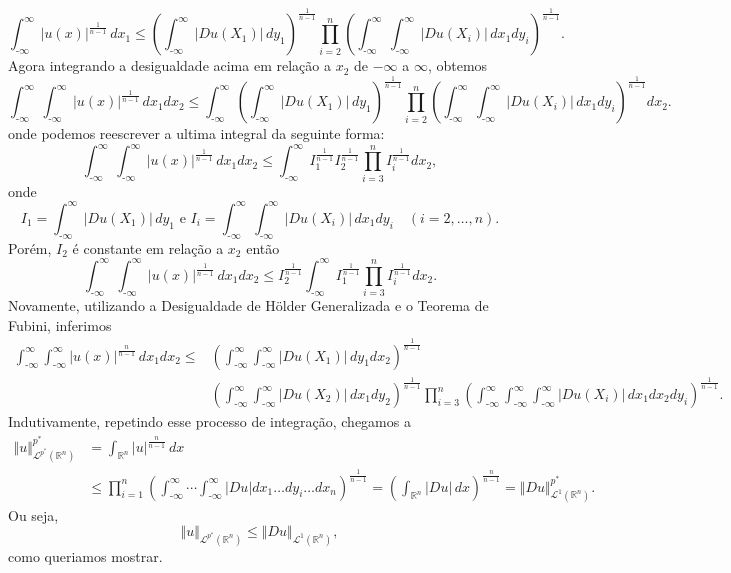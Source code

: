 \documentclass[a4paper, 11pt]{book}
\theoremstyle{definition}
\newcommand{\m}{\text{-}}
\newcommand{\bR}{\mathbb{R}}
\newcommand{\cL}{\mathcal{L}}
\begin{document}
\begin{prf}
    \[
        \int_{\m\infty}^{\infty} |u(x)|^{\frac{1}{n-1}} \,dx_1 \leqslant \left( \int_{\m\infty}^{\infty} |Du(X_1)| \,dy_1 \right)^{\frac{1}{n-1}}\prod_{i=2}^n \left(\int_{\m\infty}^{\infty}   \int_{\m\infty}^{\infty} |Du(X_i)| \, dx_1dy_i\right)^{\frac{1}{n-1}}.
    \]
    Agora integrando a desigualdade acima em relação a $x_2$ de $-\infty$ a $\infty$, obtemos
    \[
        \int_{\m\infty}^{\infty}\int_{\m\infty}^{\infty} |u(x)|^{\frac{1}{n-1}} \,dx_1dx_2 \leqslant \int_{\m\infty}^{\infty}\!\!\left( \int_{\m\infty}^{\infty} |Du(X_1)| \,dy_1 \right)^{\frac{1}{n-1}}\prod_{i=2}^n \left(\int_{\m\infty}^{\infty} \!\int_{\m\infty}^{\infty} |Du(X_i)| \, dx_1dy_i\right)^{\frac{1}{n-1}} dx_2.
    \]
    onde podemos reescrever a ultima integral da seguinte forma:
    \[
        \int_{\m\infty}^{\infty}\int_{\m\infty}^{\infty} |u(x)|^{\frac{1}{n-1}} \,dx_1dx_2 \leqslant \int_{\m\infty}^{\infty} I_1^{\frac{1}{n-1}}I_2^{\frac{1}{n-1}}\prod_{i=3}^n I_i^{\frac{1}{n-1}} dx_2,
    \]
    onde
    \[
        I_1 = \int_{\m\infty}^{\infty} |Du(X_1)| \,dy_1 \text{ e } I_i = \int_{\m\infty}^{\infty} \!\int_{\m\infty}^{\infty} |Du(X_i)| \, dx_1dy_i \quad(i = 2,\dots,n).
    \]
    Porém, $I_2$ é constante em relação a $x_2$ então
    \[
        \int_{\m\infty}^{\infty}\int_{\m\infty}^{\infty} |u(x)|^{\frac{1}{n-1}} \,dx_1dx_2 \leqslant I_2^{\frac{1}{n-1}}\int_{\m\infty}^{\infty} I_1^{\frac{1}{n-1}}\prod_{i=3}^n I_i^{\frac{1}{n-1}} dx_2.
    \]
    Novamente, utilizando a Desigualdade de Hölder Generalizada e o Teorema de Fubini, inferimos
    {\small
    \[
        \begin{aligned}
            \int_{\m\infty}^{\infty}\int_{\m\infty}^{\infty} |u(x)|^{\frac{n}{n-1}} \,dx_1dx_2 \leqslant &\left( \int_{\m\infty}^{\infty} \int_{\m\infty}^{\infty} |Du(X_1)| \,dy_1 dx_2 \right)^{\frac{1}{n-1}}\\ &\left( \int_{\m\infty}^{\infty} \int_{\m\infty}^{\infty} |Du(X_2)| \,dx_1 dy_2 \right)^{\frac{1}{n-1}} \prod_{i=3}^n \left( \int_{\m\infty}^{\infty}\int_{\m\infty}^{\infty}\int_{\m\infty}^{\infty} |Du(X_i)| \,dx_1dx_2dy_i \right)^{\frac{1}{n-1}} \!\!.
        \end{aligned}
    \]\!}
    Indutivamente, repetindo esse processo de integração, chegamos a
    \[
        \begin{aligned}
            \Vert u \Vert_{\cL^{p^*}(\bR^n)}^{p^*} &= \int_{\bR^n} |u|^{\frac{n}{n-1}} \, dx \\
            &\leqslant \prod_{i=1}^n \left( \int_{\m\infty}^{\infty} \cdots \int_{\m\infty}^\infty |Du| dx_1\dots dy_i \dots dx_n \right)^{\frac{1}{n-1}}
            = \left(\int_{\bR^n} |Du|\,dx\right)^{\frac{n}{n-1}} = \Vert Du \Vert_{\cL^1(\bR^n)}^{p^*}.
        \end{aligned}
    \]
    Ou seja,
    \begin{equation} \label{eq:desigualdadegnss}
        \Vert u \Vert_{\cL^{p^*}(\bR^n)} \leqslant\Vert Du \Vert_{\cL^1(\bR^n)},
    \end{equation}
    como queriamos mostrar.


\end{prf}
\end{document}
